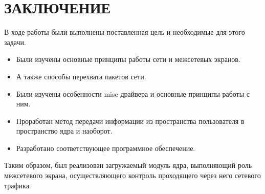 \section*{ЗАКЛЮЧЕНИЕ}

В ходе работы были выполнены поставленная цель и необходимые для этого задачи.
\begin{itemize}
	\item Были изучены основные принципы работы сети и межсетевых экранов.

	\item А также способы перехвата пакетов сети.
	
	\item Были изучены особенности misc драйвера и основные принципы работы с ним.
	
	\item Проработан метод передачи информации из пространства пользователя в пространство ядра и наоборот.
	
	\item Разработано соответствующее программное обеспечение.
\end{itemize}

Таким образом, был реализован загружаемый модуль ядра, выполняющий роль межсетевого экрана, осуществляющего контроль проходящего через него сетевого трафика. 

\pagebreak